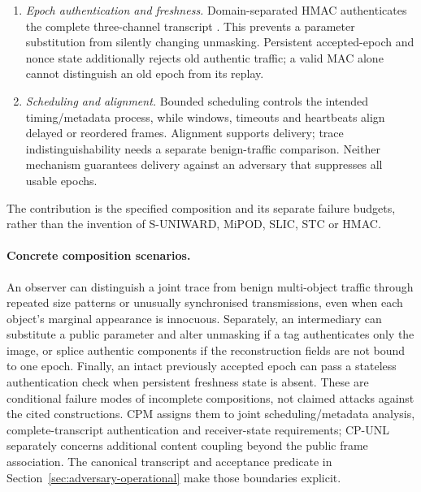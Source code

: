 \documentclass[pdflatex,sn-mathphys-num]{sn-jnl}%
\theoremstyle{definition}
\theoremstyle{game}
\theoremstyle{thmstyleone}%
\theoremstyle{thmstyletwo}%
\theoremstyle{thmstylethree}%
\begin{document}
\begin{enumerate}[label=(\roman*),leftmargin=2.1em,itemsep=0.3em]
STC translates the selected costs into coded pixel changes with low
additive distortion \cite{Filler2011STC}. It supplies the embedding/extraction
mechanism, not encryption or authentication. Extraction uses the received
image and agreed coding seed, so the receiver does not need the sender's
cost map.
\item \emph{Epoch authentication and freshness.}
Domain-separated HMAC authenticates the complete three-channel transcript
\cite{bellare1996keying,rfc2104}. This prevents a parameter substitution
from silently changing unmasking. Persistent accepted-epoch and nonce
state additionally rejects old authentic traffic; a valid MAC alone cannot
distinguish an old epoch from its replay.
\item \emph{Scheduling and alignment.}
Bounded scheduling controls the intended timing/metadata process, while
windows, timeouts and heartbeats align delayed or reordered frames.
Alignment supports delivery; trace indistinguishability needs a separate
benign-traffic comparison. Neither mechanism guarantees delivery against
an adversary that suppresses all usable epochs.
\end{enumerate}
The contribution is the specified composition and its separate failure
budgets, rather than the invention of S-UNIWARD, MiPOD, SLIC, STC or HMAC.

\paragraph{Concrete composition scenarios.}
An observer can distinguish a joint trace from benign multi-object traffic
through repeated size patterns or unusually synchronised transmissions,
even when each object's marginal appearance is innocuous. Separately, an
intermediary can substitute a public parameter and alter unmasking if a
tag authenticates only the image, or splice authentic components if the
reconstruction fields are not bound to one epoch. Finally, an intact
previously accepted epoch can pass a stateless authentication check when
persistent freshness state is absent. These are conditional failure modes
of incomplete compositions, not claimed attacks against the cited
constructions. CPM assigns them to joint scheduling/metadata analysis,
complete-transcript authentication and receiver-state requirements;
CP-UNL separately concerns additional content coupling beyond the public
frame association. The canonical transcript and acceptance predicate in
Section~\ref{sec:adversary-operational} make those boundaries explicit.
\end{document}

